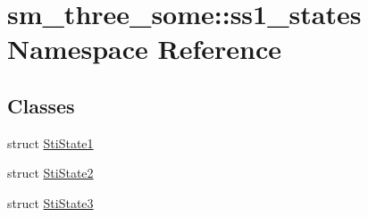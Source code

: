 \hypertarget{namespacesm__three__some_1_1ss1__states}{}\section{sm\+\_\+three\+\_\+some\+:\+:ss1\+\_\+states Namespace Reference}
\label{namespacesm__three__some_1_1ss1__states}
\subsection*{Classes}
\begin{DoxyCompactItemize}
\item 
struct \hyperlink{structsm__three__some_1_1ss1__states_1_1StiState1}{Sti\+State1}
\item 
struct \hyperlink{structsm__three__some_1_1ss1__states_1_1StiState2}{Sti\+State2}
\item 
struct \hyperlink{structsm__three__some_1_1ss1__states_1_1StiState3}{Sti\+State3}
\end{DoxyCompactItemize}
